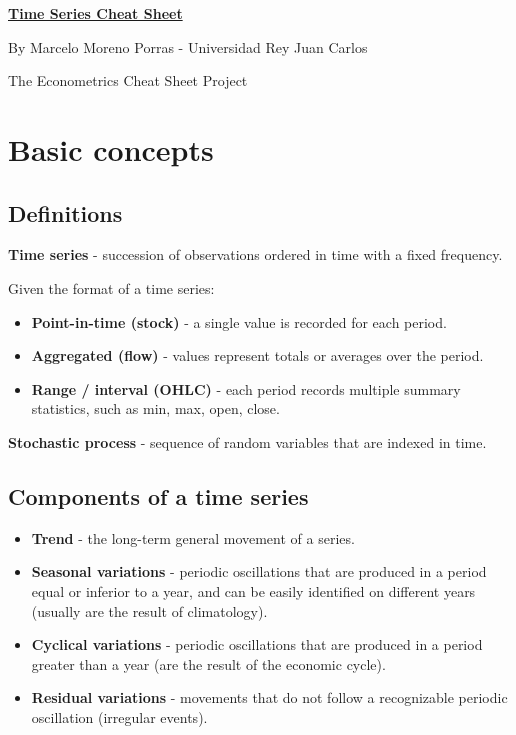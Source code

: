 \documentclass[10pt, a4paper, landscape]{article}
\begin{document}
\begin{multicols}{3}

\begin{center}
	\textbf{\LARGE \href{https://github.com/marcelomijas/econometrics-cheatsheet}{Time Series Cheat Sheet}}

	{\footnotesize By Marcelo Moreno Porras - Universidad Rey Juan Carlos}

	{\footnotesize The Econometrics Cheat Sheet Project}
\end{center}

\section*{Basic concepts}

\subsection*{Definitions}

\textbf{Time series} - succession of observations ordered in time with a fixed frequency.

Given the format of a time series:

\begin{itemize}[leftmargin=*]
	\item \textbf{Point-in-time (stock)} - a single value is recorded for each period.
	\item \textbf{Aggregated (flow)} - values represent totals or averages over the period.
	\item \textbf{Range / interval (OHLC)} - each period records multiple summary statistics, such as min, max, open, close.
\end{itemize}

\textbf{Stochastic process} - sequence of random variables that are indexed in time.

\subsection*{Components of a time series}

\begin{itemize}[leftmargin=*]
	\item \textbf{Trend} - the long-term general movement of a series.
	\item \textbf{Seasonal variations} - periodic oscillations that are produced in a period equal or inferior to a year, and can be easily identified on different years (usually are the result of climatology).
	\item \textbf{Cyclical variations} - periodic oscillations that are produced in a period greater than a year (are the result of the economic cycle).
	\item \textbf{Residual variations} - movements that do not follow a recognizable periodic oscillation (irregular events).
\end{itemize}


\end{multicols}
\end{document}
